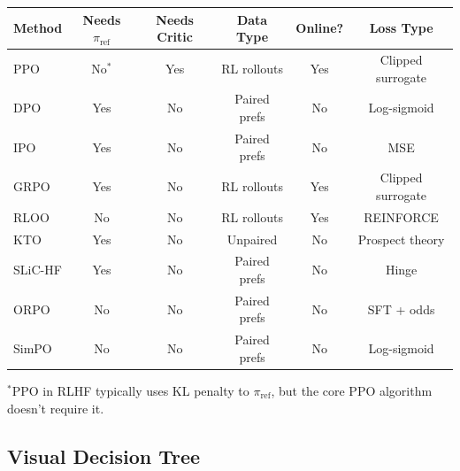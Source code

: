 \begin{center}
    \renewcommand{\arraystretch}{1.4}
    \begin{tabular}{l|ccccc}
        \textbf{Method} & \textbf{Needs $\pi_{\text{ref}}$} & \textbf{Needs Critic} & \textbf{Data Type} & \textbf{Online?} & \textbf{Loss Type} \\
        \hline
        PPO             & No$^*$                            & Yes                   & RL rollouts        & Yes              & Clipped surrogate  \\
        DPO             & Yes                               & No                    & Paired prefs       & No               & Log-sigmoid        \\
        IPO             & Yes                               & No                    & Paired prefs       & No               & MSE                \\
        GRPO            & Yes                               & No                    & RL rollouts        & Yes              & Clipped surrogate  \\
        RLOO            & No                                & No                    & RL rollouts        & Yes              & REINFORCE          \\
        KTO             & Yes                               & No                    & Unpaired           & No               & Prospect theory    \\
        SLiC-HF         & Yes                               & No                    & Paired prefs       & No               & Hinge              \\
        ORPO            & No                                & No                    & Paired prefs       & No               & SFT + odds         \\
        SimPO           & No                                & No                    & Paired prefs       & No               & Log-sigmoid        \\
    \end{tabular}
\end{center}

\noindent $^*$PPO in RLHF typically uses KL penalty to $\pi_{\text{ref}}$, but the core PPO algorithm doesn't require it.

\subsection{Visual Decision Tree}

